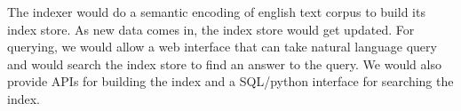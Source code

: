 \documentclass[10pt]{article}
\begin{document}
The indexer would do a semantic encoding of english text corpus to build its index store. As new data comes in, the index store would get updated. For querying, we would allow a web interface that can take natural language query and would search the index store to find an answer to the query. We would also provide APIs for building the index and a SQL/python interface for searching the index. 

 
\end{document}
